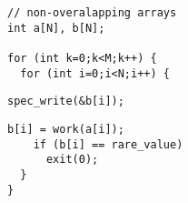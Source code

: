 \begin{lstlisting}[morekeywords={g_qCount},belowskip=0pt, name=ver1]
// non-overalapping arrays
int a[N], b[N];

for (int k=0;k<M;k++) {
  for (int i=0;i<N;i++) {
\end{lstlisting}

\begin{lstlisting}[aboveskip=0pt,belowskip=0pt,backgroundcolor=\color{lightgray}, firstnumber=auto, name=ver1]
    spec_write(&b[i]);
\end{lstlisting}

\begin{lstlisting}[aboveskip=0pt,belowskip=0pt, firstnumber=auto, name=ver1]
    b[i] = work(a[i]);
    if (b[i] == rare_value)
      exit(0);
  }
}
\end{lstlisting}

